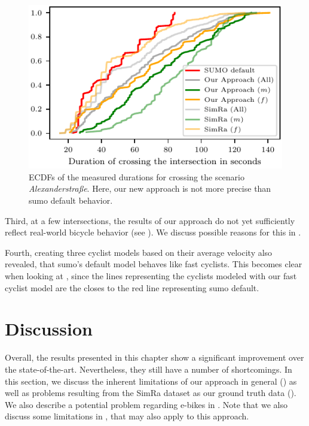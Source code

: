 \begin{figure}
    \centering
    \includegraphics[width=0.7\columnwidth]{fig/im_alex_ecdf_every.pdf}
    \caption{%
        ECDFs of the measured durations for crossing the scenario \textit{Alexanderstraße}.
        Here, our new approach is not more precise than \ac{sumo} default behavior.
    }%
    \label{fig:im_alex}
\end{figure}

Third, at a few intersections, the results of our approach do not yet sufficiently reflect real-world bicycle behavior (see ).
We discuss possible reasons for this in .

Fourth, creating three cyclist models based on their average velocity also revealed, that \ac{sumo}'s default model behaves like fast cyclists.
This becomes clear when looking at , since the lines representing the cyclists modeled with our fast cyclist model are the closes to the red line representing \ac{sumo} default.


\section{Discussion}
\label{sec:discussion_sumo}
Overall, the results presented in this chapter show a significant improvement over the state-of-the-art.
Nevertheless, they still have a number of shortcomings.
In this section, we discuss the inherent limitations of our approach in general () as well as problems resulting from the SimRa dataset as our ground truth data ().
We also describe a potential problem regarding e-bikes in .
Note that we also discuss some limitations in , that may also apply to this approach.

